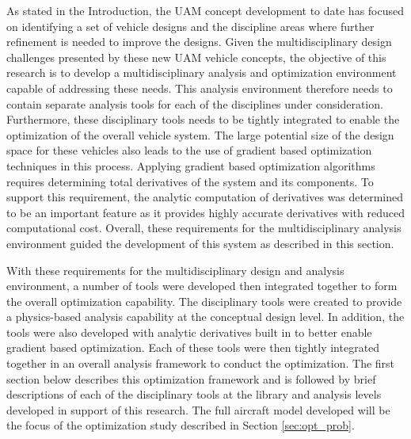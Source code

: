 
As stated in the Introduction, the UAM concept development to date has focused on identifying a set of vehicle designs and the discipline areas where further refinement is needed to improve the designs.
Given the multidisciplinary design challenges presented by these new UAM vehicle concepts, the objective of this research is to develop a multidisciplinary analysis and optimization environment capable of addressing these needs.
This analysis environment therefore needs to contain separate analysis tools for each of the disciplines under consideration.
Furthermore, these disciplinary tools needs to be tightly integrated to enable the optimization of the overall vehicle system.
The large potential size of the design space for these vehicles also leads to the use of gradient based optimization techniques in this process.
Applying gradient based optimization algorithms requires determining total derivatives of the system and its components.
To support this requirement, the analytic computation of derivatives was determined to be an important feature as it provides highly accurate derivatives with reduced computational cost.
Overall, these requirements for the multidisciplinary analysis environment guided the development of this system as described in this section.

With these requirements for the multidisciplinary design and analysis environment, a number of tools were developed then integrated together to form the overall optimization capability.
The disciplinary tools were created to provide a physics-based analysis capability at the conceptual design level.
In addition, the tools were also developed with analytic derivatives built in to better enable gradient based optimization.
Each of these tools were then tightly integrated together in an overall analysis framework to conduct the optimization.
The first section below describes this optimization framework and is followed by brief descriptions of each of the disciplinary tools at the library and analysis levels developed in support of this research. 
The full aircraft model developed will be the focus of the optimization study described in Section \ref{sec:opt_prob}.



